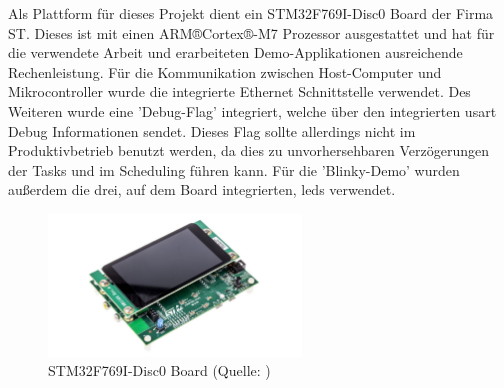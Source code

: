 \documentclass[../EDF Master Thesis.tex]{subfiles}
\begin{document}
Als Plattform für dieses Projekt dient ein STM32F769I-Disc0 Board der Firma ST.
Dieses ist mit einen ARM®Cortex®-M7 Prozessor ausgestattet und hat für die verwendete Arbeit und erarbeiteten Demo-Applikationen ausreichende Rechenleistung.
Für die Kommunikation zwischen Host-Computer und Mikrocontroller wurde die integrierte Ethernet Schnittstelle verwendet.
Des Weiteren wurde eine 'Debug-Flag' integriert, welche über den integrierten \ac{usart} Debug Informationen sendet.
Dieses Flag sollte allerdings nicht im Produktivbetrieb benutzt werden, da dies zu unvorhersehbaren Verzögerungen der Tasks und im Scheduling führen kann.
Für die 'Blinky-Demo' wurden außerdem die drei, auf dem Board integrierten, \ac{led}s verwendet.

\begin{figure}[ht!]
    \begin{center}
        \includegraphics[width=0.6\textwidth]{attachments/stm32f769i-disc0.pdf}
    \end{center}
    \caption[STM32F769I-Disc0 Board]{STM32F769I-Disc0 Board (Quelle: \cite{stm:001})}
    \label{fig:STM32F769I-Disc0_board}
\end{figure}
\end{document}
